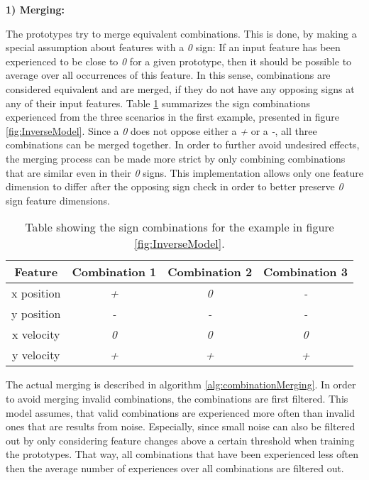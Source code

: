 \textbf{1) Merging:}

The prototypes try to merge equivalent combinations. This is done, by making a special assumption about features with a \textit{0} sign: If an input feature has been experienced to be close to \textit{0} for a given prototype, then it should be possible to average over all occurrences of this feature. 
In this sense, combinations are considered equivalent and are merged, if they do not have any opposing signs at any of their input features.
Table \ref{tab:signCombinations2} summarizes the sign combinations experienced from the three scenarios in the first example, presented in figure \ref{fig:InverseModel}.
Since a \textit{0} does not oppose either a \textit{+} or a \textit{-}, all three combinations can be merged together.
In order to further avoid undesired effects, the merging process can be made more strict by only combining combinations that are similar even in their \textit{0} signs. This implementation allows only one feature dimension to differ after the opposing sign check in order to better preserve \textit{0} sign feature dimensions.

\begin{table}
	\centering
	\begin{tabular}{|c|c|c|c|}
		\hline Feature & Combination 1 & Combination 2 & Combination 3 \\ 
		\hline x position & \textit{+} & \textit{0} & \textit{-} \\ 
		\hline y position & \textit{-} & \textit{-} & \textit{-} \\ 
		\hline x velocity & \textit{0} & \textit{0} & \textit{0} \\
		\hline y velocity & \textit{+} & \textit{+} & \textit{+} \\ 
		\hline 
	\end{tabular} 
	\caption{Table showing the sign combinations for the example in figure \ref{fig:InverseModel}.}
	\label{tab:signCombinations2}
\end{table}

The actual merging is described in algorithm \ref{alg:combinationMerging}. In order to avoid merging invalid combinations, the combinations are first filtered. This model assumes, that valid combinations are experienced more often than invalid ones that are results from noise. 
Especially, since small noise can also be filtered out by only considering feature changes above a certain threshold when training the prototypes. That way, all combinations that have been experienced less often then the average number of experiences over all combinations are filtered out. 

